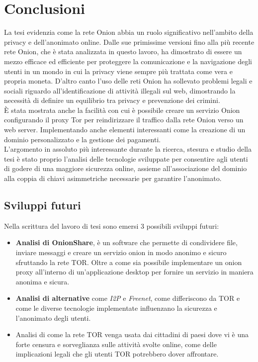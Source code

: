 \chapter{Conclusioni}

La tesi evidenzia come la rete Onion abbia un ruolo significativo nell'ambito della privacy e dell'anonimato online. 
Dalle sue primissime versioni fino alla più recente rete Onion, che è stata analizzata in questo lavoro, ha dimostrato di essere un mezzo efficace ed efficiente per proteggere la comunicazione e la navigazione degli utenti in un mondo in cui la privacy viene sempre più trattata come vera e propria moneta.
D'altro canto l'uso delle reti Onion ha sollevato problemi legali e sociali riguardo all'identificazione di attività illegali sul web, dimostrando la necessità di definire un equilibrio tra privacy e prevenzione dei crimini.
\\

È stata mostrata anche la facilità con cui è possibile creare un servizio Onion configurando il proxy Tor per reindirizzare il traffico dalla rete Onion verso un web server. 
Implementando anche elementi interessanti come la creazione di un dominio personalizzato e la gestione dei pagamenti.
\\

L'argomento in assoluto più interessante durante la ricerca, stesura e studio della tesi è stato proprio l'analisi delle tecnologie sviluppate per consentire agli utenti di godere di una maggiore sicurezza online, assieme all'associazione del dominio alla coppia di chiavi asimmetriche necessarie per garantire l'anonimato. 

\section{Sviluppi futuri}
Nella scrittura del lavoro di tesi sono emersi 3 possibili sviluppi futuri:
\begin{itemize}
    \item \textbf{Analisi di OnionShare}, è un software che permette di condividere file, inviare messaggi e creare un servizio onion in modo anonimo e sicuro sfruttando la rete TOR. Oltre a come sia possibile implementare un onion proxy all'interno di un'applicazione desktop per fornire un servizio in maniera anonima e sicura.
    \item \textbf{Analisi di alternative} come \emph{I2P} e \emph{Freenet}, come differiscono da TOR e come le diverse tecnologie implementate influenzano la sicurezza e l'anonimato degli utenti.
    \item Analisi di come la rete TOR venga usata dai cittadini di paesi dove vi è una forte censura e sorveglianza sulle attività svolte online, come delle implicazioni legali che gli utenti TOR potrebbero dover affrontare. 
\end{itemize}

